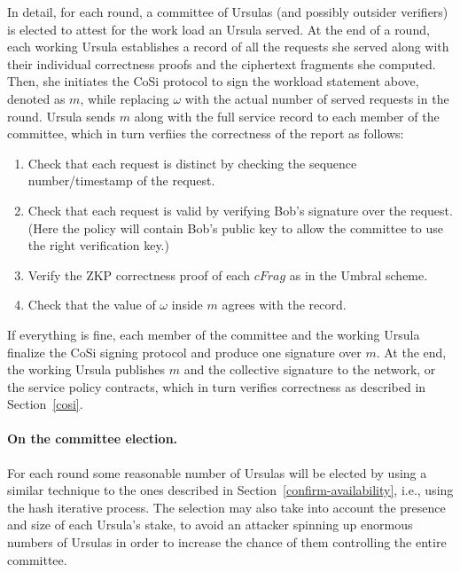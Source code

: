 In detail, for each round, a committee of Ursulas (and possibly outsider verifiers) is elected to attest for the work load an Ursula served. At the end of a round, each working Ursula establishes a record of all the requests she served along with their individual correctness proofs and the ciphertext fragments she computed. Then, she initiates the CoSi protocol to sign the workload statement above, denoted as $m$, while replacing $\omega$ with the actual number of served requests in the round. Ursula sends $m$ along with the full service record to each member of the committee, which in turn verfiies the correctness of the report as follows: 

\begin{enumerate}
\item Check that each request is distinct by checking the sequence number/timestamp of the request.

\item Check that each request is valid by verifying Bob's signature over the request. (Here the policy will contain Bob's public key to allow the committee to use the right verification key.)

\item Verify the ZKP correctness proof of each $cFrag$ as in the Umbral scheme.

\item Check that the value of $\omega$ inside $m$ agrees with the record.
\end{enumerate}


If everything is fine, each member of the committee and the working Ursula finalize the CoSi signing protocol and produce one signature over $m$. At the end, the working Ursula publishes $m$ and the collective signature to the network, or the service policy contracts, which in turn verifies correctness as described in Section~\ref{cosi}.


\paragraph{\bf On the committee election.} 
For each round some reasonable number of Ursulas will be elected by using a similar technique to the ones described in Section~\ref{confirm-availability}, i.e., using the hash iterative process. The selection may also take into account the presence and size of each Ursula's stake, to avoid an attacker spinning up enormous numbers of Ursulas in order to increase the chance of them controlling the entire committee.


